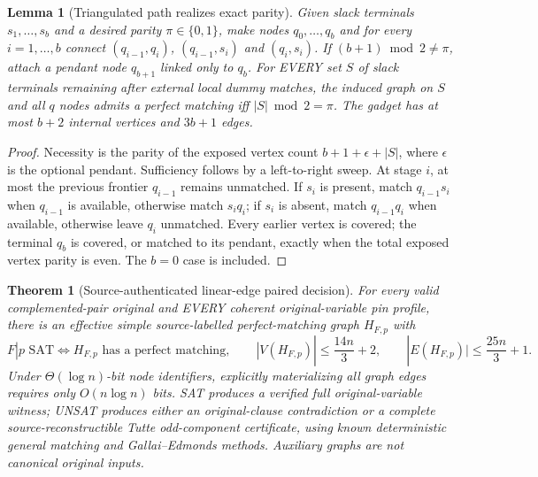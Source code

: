 \documentclass[11pt]{article}
\newtheorem{theorem}{Theorem}
\newtheorem{lemma}{Lemma}
\begin{document}
\begin{lemma}[Triangulated path realizes exact parity]
Given slack terminals $s_1,\ldots,s_b$ and a desired parity $\pi\in\{0,1\}$, make nodes $q_0,\ldots,q_b$ and for every $i=1,\ldots,b$ connect $(q_{i-1},q_i)$, $(q_{i-1},s_i)$ and $(q_i,s_i)$. If $(b+1)\bmod2\neq\pi$, attach a pendant node $q_{b+1}$ linked only to $q_b$. For EVERY set $S$ of slack terminals remaining after external local dummy matches, the induced graph on $S$ and all $q$ nodes admits a perfect matching iff $|S|\bmod2=\pi$. The gadget has at most $b+2$ internal vertices and $3b+1$ edges.
\end{lemma}
\begin{proof}
Necessity is the parity of the exposed vertex count $b+1+\epsilon+|S|$, where $\epsilon$ is the optional pendant. Sufficiency follows by a left-to-right sweep. At stage $i$, at most the previous frontier $q_{i-1}$ remains unmatched. If $s_i$ is present, match $q_{i-1}s_i$ when $q_{i-1}$ is available, otherwise match $s_iq_i$; if $s_i$ is absent, match $q_{i-1}q_i$ when available, otherwise leave $q_i$ unmatched. Every earlier vertex is covered; the terminal $q_b$ is covered, or matched to its pendant, exactly when the total exposed vertex parity is even. The $b=0$ case is included.
\end{proof}
\begin{theorem}[Source-authenticated linear-edge paired decision]
For every valid complemented-pair original and EVERY coherent original-variable pin profile, there is an effective simple source-labelled perfect-matching graph $H_{F,p}$ with
\[
F|p\text{ SAT}\iff H_{F,p}\text{ has a perfect matching},\qquad
|V(H_{F,p})|\le\frac{14n}{3}+2,\qquad
|E(H_{F,p})|\le\frac{25n}{3}+1.
\]
Under $\Theta(\log n)$-bit node identifiers, explicitly materializing all graph edges requires only $O(n\log n)$ bits. SAT produces a verified full original-variable witness; UNSAT produces either an original-clause contradiction or a complete source-reconstructible Tutte odd-component certificate, using known deterministic general matching and Gallai--Edmonds methods. Auxiliary graphs are \emph{not} canonical original inputs.
\end{theorem}
\end{document}
